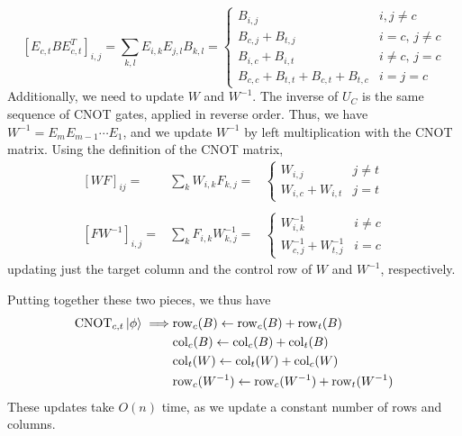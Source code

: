 \begin{equation}
\label{eq:cnot_phaseupdate}
\left[E_{c,t}BE_{c,t}^{T}\right]_{i,j} = \sum_{k,l}E_{i,k}E_{j,l}B_{k,l} =
\begin{cases}
B_{i,j} & i,j\neq c \\
B_{c,j}+B_{t,j} & i=c,\,j\neq c\\
B_{i,c}+B_{i,t} & i\neq c,\,j=c\\
B_{c,c}+B_{t,t} + B_{c,t} + B_{t,c} & i=j=c
\end{cases}
\end{equation}
Additionally, we need to update $W$ and $W^{-1}$. The inverse of $U_{C}$ is the same sequence of CNOT gates, applied in reverse order. Thus, we have $W^{-1}=E_{m}E_{m-1}\cdots E_{1}$, and we update $W^{-1}$ by left multiplication with the CNOT matrix. Using the definition of the CNOT matrix,
\[
\begin{array}{rcl}
\left[WF\right]_{ij} = &  \sum_{k}W_{i,k}F_{k,j} = & \begin{cases} W_{i,j} & j\neq t \\ W_{i,c}+W_{i,t} & j=t \end{cases}\\
\\
\left[FW^{-1}\right]_{i,j} = &  \sum_{k}F_{i,k}W_{k,j}^{-1} = & \begin{cases} W^{-1}_{i,k} & i\neq c \\ W^{-1}_{c,j}+W^{-1}_{t,j} & i=c \end{cases}
\end{array}\]
updating just the target column and the control row of $W$ and $W^{-1}$, respectively.\par
Putting together these two pieces, we thus have
\begin{align}
\text{CNOT}_{c,t}\ket{\phi} \implies & \mathrm{row}_{c}(B) \gets \mathrm{row}_{c}(B)+\mathrm{row}_{t}(B) \nonumber \\
& \mathrm{col}_{c}(B) \gets \mathrm{col}_{c}(B)+\mathrm{col}_{t}(B) \nonumber \\
& \mathrm{col}_{t}(W) \gets \mathrm{col}_{t}(W) + \mathrm{col}_{c}(W) \nonumber \\
& \mathrm{row}_{c}(W^{-1}) \gets \mathrm{row}_{c}(W^{-1}) + \mathrm{row}_{t}(W^{-1})
\end{align}
These updates take $O(n)$ time, as we update a constant number of rows and columns.\par
